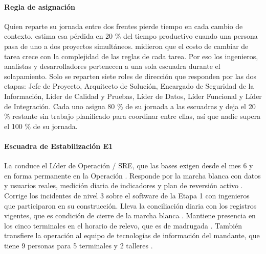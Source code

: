 \paragraph{Regla de asignación}
Quien reparte su jornada entre dos frentes pierde tiempo en cada cambio de contexto.
\textcite{weinberg1992} estima esa pérdida en 20 \% del tiempo productivo cuando una persona pasa de
uno a dos proyectos simultáneos. \textcite{rubinstein2001} midieron que el costo de cambiar de tarea
crece con la complejidad de las reglas de cada tarea. Por eso los ingenieros, analistas y
desarrolladores pertenecen a una sola escuadra durante el solapamiento. Solo se reparten siete roles
de dirección que responden por las dos etapas: Jefe de Proyecto, Arquitecto de Solución, Encargado de
Seguridad de la Información, Líder de Calidad y Pruebas, Líder de Datos, Líder Funcional y Líder de
Integración. Cada uno asigna 80 \% de su jornada a las escuadras y deja el 20 \% restante sin trabajo
planificado para coordinar entre ellas, así que nadie supera el 100 \% de su jornada.


\paragraph{Escuadra de Estabilización E1}
La conduce el Líder de Operación / SRE, que las bases exigen desde el mes 6 y en forma permanente en
la Operación . Responde por la marcha blanca con datos y usuarios reales,
medición diaria de indicadores y plan de reversión activo . Corrige los incidentes de
nivel 3 sobre el software de la Etapa 1 con ingenieros que participaron en su construcción. Lleva la
conciliación diaria con los registros vigentes, que es condición de cierre de la marcha blanca
. Mantiene presencia en los cinco terminales en el horario de relevo, que es de
madrugada . También transfiere la operación al equipo de tecnologías de información
del mandante, que tiene 9 personas para 5 terminales y 2 talleres .

